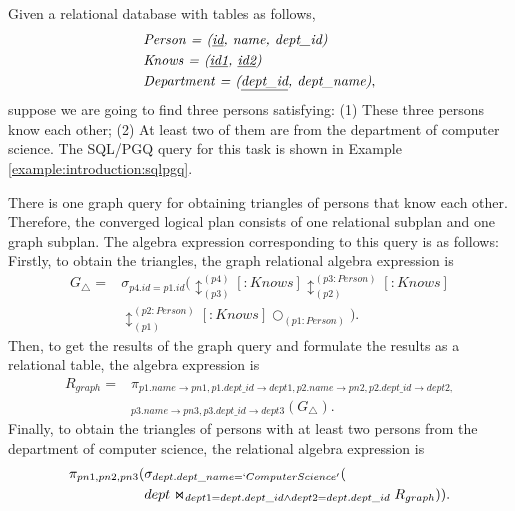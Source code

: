 \begin{example}
    Given a relational database with tables as follows,
    \begin{equation*}
        \begin{split}
            & \textit{Person = (\underline{id}, name, dept\_id)} \\
            & \textit{Knows = (\underline{id1}, \underline{id2})} \\
            & \textit{Department = (\underline{dept\_id}, dept\_name)}, \\
        \end{split}
    \end{equation*}
    suppose we are going to find three persons satisfying: 
    (1) These three persons know each other;
    (2) At least two of them are from the department of computer science.
    The SQL/PGQ query for this task is shown in Example \ref{example:introduction:sqlpgq}.      

    There is one graph query for obtaining triangles of persons that know each other.
    Therefore, the converged logical plan consists of one relational subplan and one graph subplan.
    The algebra expression corresponding to this query is as follows:
    Firstly, to obtain the triangles, the graph relational algebra expression is
    \begin{equation*}
        \begin{split}
            G_{\triangle} = & \sigma_{p4.id = p1.id}(\updownarrow_{(p3)}^{(p4)}[:Knows]\updownarrow_{(p2)}^{(p3:Person)}[:Knows] \\
            & \updownarrow_{(p1)}^{(p2:Person)}[:Knows]\bigcirc_{(p1:Person)}).
        \end{split}
    \end{equation*}
    Then, to get the results of the graph query and formulate the results as a relational table, the algebra expression is 
    \begin{equation*}
        \begin{split}
            R_{graph} = & \pi_{p1.name\rightarrow pn1, p1.dept\_id \rightarrow dept1,p2.name\rightarrow pn2, p2.dept\_id \rightarrow dept2,} \\
            & _{p3.name\rightarrow pn3, p3.dept\_id \rightarrow dept3}(G_{\triangle}).
        \end{split}
    \end{equation*}
    Finally, to obtain the triangles of persons with at least two persons from the department of computer science, the relational algebra expression is
    \begin{equation*}
        \begin{split}
        \pi_{pn1, pn2, pn3}
        (& \sigma_{dept.dept\_name = `Computer Science'}( \\ 
        & dept \Join_{dept1=dept.dept\_id \land dept2=dept.dept\_id} R_{graph})).
        \end{split}
    \end{equation*}


\end{example}
